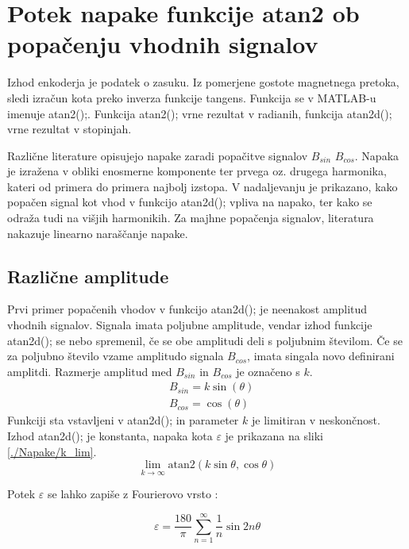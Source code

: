 \chapter{Potek napake funkcije atan2 ob popačenju vhodnih signalov}
Izhod enkoderja je podatek o zasuku. Iz pomerjene gostote magnetnega pretoka, sledi izračun kota preko inverza funkcije tangens. Funkcija se v MATLAB-u imenuje atan2();. Funkcija atan2(); vrne rezultat v radianih, funkcija atan2d(); vrne rezultat v stopinjah\cite{atan2Matlab}\cite{atan2dMatlab}.

Različne literature \cite{RLS3} \cite{osnova} \cite{RLS1} \cite{RLS2} opisujejo napake zaradi popačitve signalov $B_{sin}$ $B_{cos}$. Napaka je izražena v obliki enosmerne komponente ter prvega oz. drugega harmonika, kateri od primera do primera najbolj izstopa. V nadaljevanju je prikazano, kako popačen signal kot vhod v funkcijo atan2d(); vpliva na napako, ter kako se odraža tudi na višjih harmonikih. Za majhne popačenja signalov, literatura nakazuje linearno naraščanje napake.

\section{Različne amplitude}

Prvi primer popačenih vhodov v funkcijo atan2d(); je neenakost amplitud vhodnih signalov. Signala imata poljubne amplitude, vendar izhod funkcije atan2d(); se nebo spremenil, če se obe amplitudi deli s poljubnim številom. Če se za poljubno število vzame amplitudo signala $B_{cos}$, imata singala novo definirani amplitdi. Razmerje amplitud med $B_{sin}$ in $B_{cos}$ je označeno s $k$.
\begin{eqnarray}
\label{equ:def_sin_ama}
&B_{sin} = k \sin(\theta)\\
\label{equ:def_cos_amp}
&B_{cos} =\cos(\theta)
\end{eqnarray}
Funkciji sta vstavljeni v atan2d(); in parameter $k$ je limitiran v neskončnost. Izhod atan2d(); je konstanta, napaka kota $\varepsilon$ je prikazana na sliki \ref{./Napake/k_lim}.
\begin{equation}
\lim_{k \rightarrow \infty} \mathrm{atan2}(k \sin{\theta},\cos{\theta})
\end{equation}

Potek $\varepsilon$ se lahko zapiše z Fourierovo vrsto \cite{Matematika1}:

\begin{equation}
\varepsilon = \frac{180}{\pi}\sum_{n=1}^{\infty}\frac{1}{n} \sin 2 n \theta
\end{equation}

